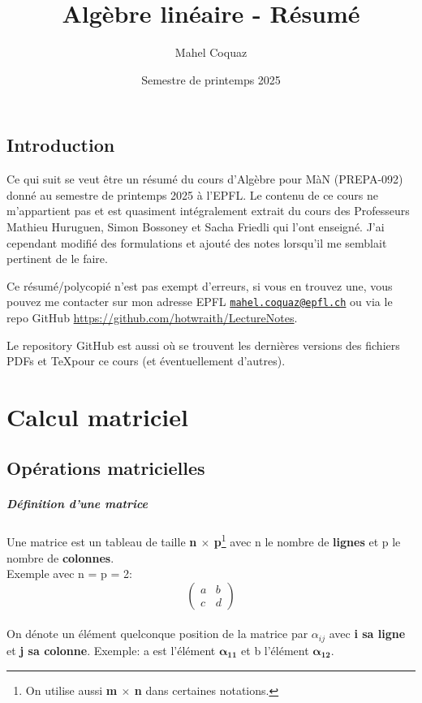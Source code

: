 \documentclass[10pt,a4paper]{book}
\title{Algèbre linéaire \vspace{0.2cm} - Résumé}
\author{Mahel Coquaz}
\date{Semestre de printemps 2025}
\newcommand{\x}{$\times$ }
\begin{document}
\maketitle
\tableofcontents
\newpage
\section*{Introduction}
Ce qui suit se veut être un résumé du cours d'Algèbre pour MàN (PREPA-092) donné au semestre de printemps 2025 à l'EPFL. Le contenu de ce cours ne m'appartient pas et est quasiment intégralement extrait du cours des Professeurs Mathieu Huruguen, Simon Bossoney et Sacha Friedli qui l'ont enseigné. J'ai cependant modifié des formulations et ajouté des notes lorsqu'il me semblait pertinent de le faire. \par
Ce résumé/polycopié n'est pas exempt d'erreurs, si vous en trouvez une, vous pouvez me contacter sur mon adresse EPFL \texttt{\href{mailto:mahel.coquaz@epfl.ch}{mahel.coquaz@epfl.ch}} ou via le repo GitHub \url{https://github.com/hotwraith/LectureNotes}. \par
Le repository GitHub est aussi où se trouvent les dernières versions des fichiers PDFs et \TeX pour ce cours (et éventuellement d'autres).

\chapter{Calcul matriciel}

\section{Opérations matricielles}

\paragraph{Définition d'une matrice} Une matrice est un tableau de taille \textbf{n \x p}\footnote{On utilise aussi \textbf{m \x n} dans certaines notations.} avec n le nombre de \textbf{lignes} et p le nombre de \textbf{colonnes}. \\
Exemple avec n = p = 2:
\[\begin{pmatrix}
a & b \\
c & d
\end{pmatrix}\] \\
On dénote un élément quelconque position de la matrice par $\alpha_{ij}$ avec \textbf{i sa ligne} et \textbf{j sa colonne}. Exemple: a est l'élément $\mathbf{\alpha_{11}}$ et b l'élément $\mathbf{\alpha_{12}}$.
\end{document}
